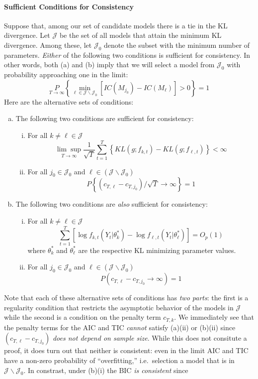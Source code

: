 \documentclass[12pt]{article}
\theoremstyle{definition}
\begin{document}
\paragraph{Sufficient Conditions for Consistency}
Suppose that, among our set of candidate models there is a tie in the KL divergence. Let $\mathcal{J}$ be the set of all models that attain the minimum KL divergence. Among these, let $\mathcal{J}_0$ denote the subset with the minimum number of parameters. \emph{Either} of the following two conditions is sufficient for consistency. In other words, both (a) and (b) imply that we will select a model from $\mathcal{J}_0$ with probability approaching one in the limit:
	$$\underset{T\rightarrow \infty}P\left\{ \underset{\ell \in \mathcal{J}\backslash \mathcal{J}_0}{\min} \left[ IC(M_{j_0}) - IC(M_\ell)\right] > 0 \right\} = 1$$
Here are the alternative sets of conditions: 
	\begin{enumerate}[(a)]
		\item The following two conditions are sufficient for consistency:
			\begin{enumerate}[(i)]
				\item For all $k \neq \ell \in \mathcal{J}$ 
					$$\underset{T\rightarrow \infty}{\lim\sup} \frac{1}{\sqrt{T}} \sum_{t=1}^T\left\{ KL(g; f_{k,t}) - KL(g;f_{\ell,t}) \right\}<\infty$$
				\item For all $j_0 \in \mathcal{J}_0$ and $\ell \in (\mathcal J \backslash \mathcal{J}_0)$
					$$P\left\{\left(c_{T,\ell} - c_{T,j_0} \right)/\sqrt{T} \rightarrow \infty \right\}= 1$$
			\end{enumerate}
		\item The following two conditions are \emph{also} sufficient for consistency:
			\begin{enumerate}[(i)]
				\item For all $k \neq \ell \in \mathcal{J}$ 
					$$\sum_{t=1}^T \left[\log f_{k,t}(Y_t|\theta^*_k) - \log f_{\ell,t}(Y_t|\theta^*_\ell) \right] = O_p(1)$$
				where $\theta^*_k$ and $\theta^*_\ell$ are the respective KL minimizing parameter values.
				\item For all $j_0 \in \mathcal{J}_0$ and $\ell \in (\mathcal J \backslash \mathcal{J}_0)$
					$$P\left(c_{T,\ell} - c_{T,j_0} \rightarrow \infty \right) = 1$$
			\end{enumerate}
	\end{enumerate}
Note that each of these alternative sets of conditions has \emph{two parts}: the first is a regularity condition that restricts the asymptotic behavior of the models in $\mathcal{J}$ while the second is a condition on the penalty term $c_{T,k}$. We immediately see that the penalty terms for the AIC and TIC \emph{cannot} satisfy (a)(ii) or (b)(ii) since $(c_{T,\ell} - c_{T,j_0})$ \emph{does not depend on sample size}. While this does not consitute a proof, it does turn out that neither is consistent: even in the limit AIC and TIC have a non-zero probability of ``overfitting,'' i.e.\ selection a model that is in $\mathcal{J}\backslash \mathcal{J}_0$. In constrast, under (b)(i) the BIC \emph{is consistent} since
\end{document}
